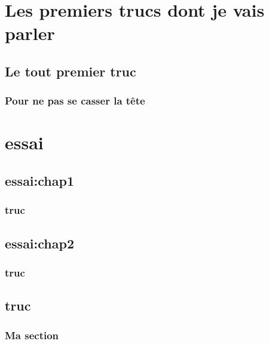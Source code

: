 \documentclass[bare]{polytech/polytech}
\begin{document}
\lipsum[1-3] 

\part{Les premiers trucs dont je vais parler}                

\chapter{Le tout premier truc}   

\lipsum[1]
           
\section{Pour ne pas se casser la tête}

\lipsum[1-6]

\part{essai}
 
\chapter{essai:chap1}
      
\lipsum[1-4]
     
\section{truc}

\chapter*{essai:chap2}
     
\lipsum[1-4]

\section{truc}

  
\chapter{truc}
\lipsum[1-20]         
 
\section{Ma section}
\lipsum[1-5]
\end{document}
